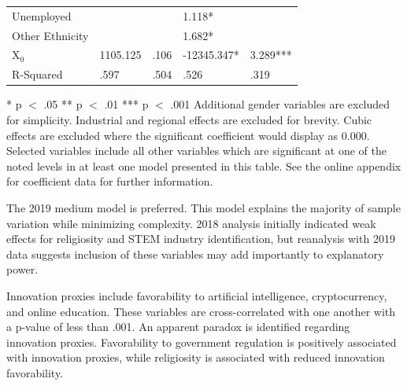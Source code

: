 \documentclass[AER]{./aea-latex-templates/AEA}
\begin{document}
\begin{table}
\begin{tabular}{lllll}
            Unemployed &  &  & 1.118* &  \\ %
            Other Ethnicity &  &  & 1.682* & \\ %
            X$_0$ & 1105.125 & .106 & -12345.347* & 3.289*** \\
            \bottomrule
            R-Squared & .597 & .504 & .526 & .319 %
        
            \end{tabular}
            \begin{tablenotes}
                * p $<$ .05
                ** p $<$ .01
                *** p $<$ .001
                Additional gender variables are excluded for simplicity.
                Industrial and regional effects are excluded for brevity.
                Cubic effects are excluded where the significant coefficient would display as 0.000.
                Selected variables include all other variables which are significant at one of the noted levels in at least one model presented in this table.
                See the online appendix for coefficient data for further information.
            \end{tablenotes}
            \label{tab:models}
            \end{table}
        
        The 2019 medium model is preferred. This model explains the majority of sample variation
        while minimizing complexity.
        2018 analysis initially indicated weak effects for religiosity and STEM industry identification,
        but reanalysis with 2019 data suggests inclusion of these variables may add importantly to
        explanatory power.
        
        Innovation proxies include favorability to artificial
        intelligence, cryptocurrency, and online education. These variables are
        cross-correlated with one another with a p-value of less than .001.
        An apparent paradox is identified regarding innovation proxies.
        Favorability to government regulation is positively associated with
        innovation proxies, while religiosity is associated with reduced
        innovation favorability.
        
\end{document}
